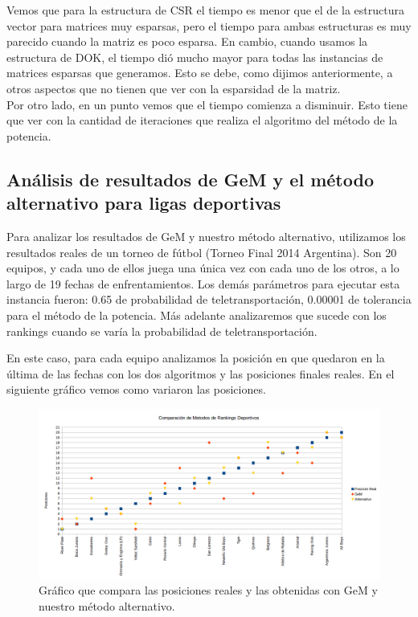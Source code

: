 Vemos que para la estructura de CSR el tiempo es menor que el de la estructura vector para matrices muy esparsas, pero el tiempo para ambas estructuras es muy parecido cuando la matriz es poco esparsa. En cambio, cuando usamos la estructura de DOK, el tiempo dió mucho mayor para todas las instancias de matrices esparsas que generamos. Esto se debe, como dijimos anteriormente, a otros aspectos que no tienen que ver con la esparsidad de la matriz.\\

Por otro lado, en un punto vemos que el tiempo comienza a disminuir. Esto tiene que ver con la cantidad de iteraciones que realiza el algoritmo del método de la potencia.\\

\newpage

\subsection{Análisis de resultados de GeM y el método alternativo para ligas deportivas}

Para analizar los resultados de GeM y nuestro método alternativo, utilizamos los resultados reales de un torneo de fútbol (Torneo Final 2014 Argentina). Son 20 equipos, y cada uno de ellos juega una única vez con cada uno de los otros, a lo largo de 19 fechas de enfrentamientos. Los demás parámetros para ejecutar esta instancia fueron: 0.65 de probabilidad de teletransportación, 0.00001 de tolerancia para el método de la potencia. Más adelante analizaremos que sucede con los rankings cuando se varía la probabilidad de teletransportación.

En este caso, para cada equipo analizamos la posición en que quedaron en la última de las fechas con los dos algoritmos y las posiciones finales reales. En el siguiente gráfico vemos como variaron las posiciones. 


\begin{figure}[H]
  \includegraphics[scale=0.5]{imagenes/posicionesgem.png}
   \caption{Gráfico que compara las posiciones reales y las obtenidas con GeM y nuestro método alternativo.}
  \label{fig:img1}
\end{figure}

